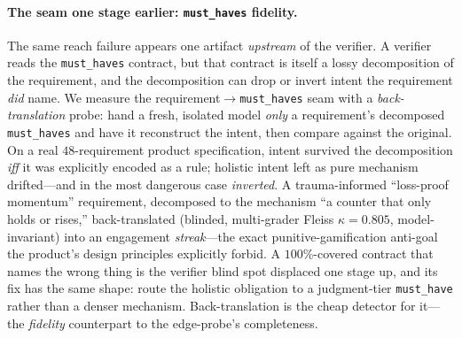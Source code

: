 \documentclass[11pt]{article}
\newcommand{\code}[1]{\texttt{#1}}
\begin{document}
\paragraph{The seam one stage earlier: \code{must\_haves} fidelity.}
The same reach failure appears one artifact \emph{upstream} of the verifier. A verifier reads the
\code{must\_haves} contract, but that contract is itself a lossy decomposition of the requirement, and
the decomposition can drop or invert intent the requirement \emph{did} name. We measure the
requirement$\to$\code{must\_haves} seam with a \emph{back-translation} probe: hand a fresh, isolated
model \emph{only} a requirement's decomposed \code{must\_haves} and have it reconstruct the intent, then
compare against the original. On a real $48$-requirement product specification, intent survived the
decomposition \emph{iff} it was explicitly encoded as a rule; holistic intent left as pure mechanism
drifted---and in the most dangerous case \emph{inverted}. A trauma-informed ``loss-proof momentum''
requirement, decomposed to the mechanism ``a counter that only holds or rises,'' back-translated
(blinded, multi-grader Fleiss $\kappa=0.805$, model-invariant) into an engagement \emph{streak}---the
exact punitive-gamification anti-goal the product's design principles explicitly forbid. A
$100\%$-covered contract that names the wrong thing is the verifier blind spot displaced one stage up,
and its fix has the same shape: route the holistic obligation to a judgment-tier \code{must\_have}
rather than a denser mechanism. Back-translation is the cheap detector for it---the \emph{fidelity}
counterpart to the edge-probe's completeness.
\end{document}
